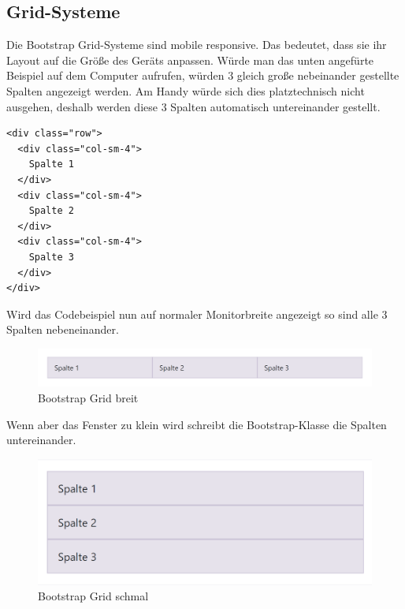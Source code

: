 \subsection{Grid-Systeme}
Die Bootstrap Grid-Systeme sind mobile responsive. Das bedeutet, dass sie ihr Layout auf die Größe des Geräts anpassen. Würde man das unten angefürte Beispiel auf dem Computer aufrufen,  würden 3 gleich große nebeinander gestellte Spalten angezeigt werden. Am Handy würde sich dies platztechnisch nicht ausgehen, deshalb werden diese 3 Spalten automatisch untereinander gestellt.
\begin{lstlisting}
<div class="row">
  <div class="col-sm-4">
  	Spalte 1
  </div>
  <div class="col-sm-4">
  	Spalte 2
  </div>
  <div class="col-sm-4">
  	Spalte 3
  </div>
</div>
\end{lstlisting}
Wird das Codebeispiel nun auf normaler Monitorbreite angezeigt so sind alle 3 Spalten nebeneinander.
\begin{figure}[H]
\begin{center}
	\includegraphics[scale=.6]{images/bootstrap1.png}
\end{center}
	\caption{Bootstrap Grid breit}
	\label{fig:sample}
\end{figure}
Wenn aber das Fenster zu klein wird schreibt die Bootstrap-Klasse die Spalten untereinander.
\begin{figure}[H]
\begin{center}
	\includegraphics[scale=.6]{images/bootstrap2.png}
\end{center}
	\caption{Bootstrap Grid schmal}
	\label{fig:sample}
\end{figure}


